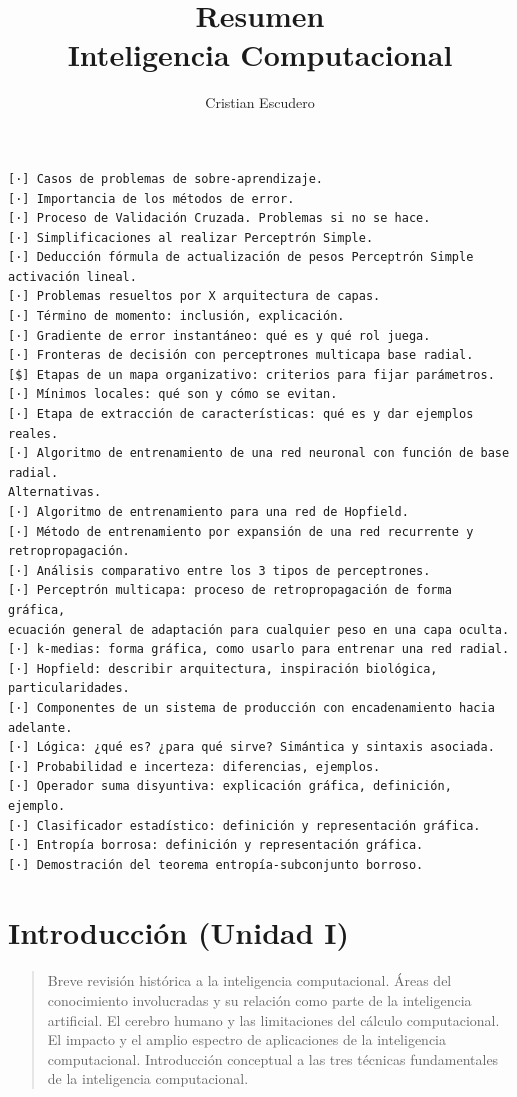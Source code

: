 \documentclass[10pt,a4paper]{article}
\author{Cristian Escudero}
\title{Resumen\\Inteligencia Computacional}
\begin{document}
\maketitle

\begin{verbatim}
[·] Casos de problemas de sobre-aprendizaje.
[·] Importancia de los métodos de error.
[·] Proceso de Validación Cruzada. Problemas si no se hace.
[·] Simplificaciones al realizar Perceptrón Simple.
[·] Deducción fórmula de actualización de pesos Perceptrón Simple activación lineal.
[·] Problemas resueltos por X arquitectura de capas.
[·] Término de momento: inclusión, explicación.
[·] Gradiente de error instantáneo: qué es y qué rol juega.
[·] Fronteras de decisión con perceptrones multicapa base radial.
[$] Etapas de un mapa organizativo: criterios para fijar parámetros.
[·] Mínimos locales: qué son y cómo se evitan.
[·] Etapa de extracción de características: qué es y dar ejemplos reales.
[·] Algoritmo de entrenamiento de una red neuronal con función de base radial. 
Alternativas.
[·] Algoritmo de entrenamiento para una red de Hopfield.
[·] Método de entrenamiento por expansión de una red recurrente y retropropagación.
[·] Análisis comparativo entre los 3 tipos de perceptrones.
[·] Perceptrón multicapa: proceso de retropropagación de forma gráfica,
ecuación general de adaptación para cualquier peso en una capa oculta.
[·] k-medias: forma gráfica, como usarlo para entrenar una red radial.
[·] Hopfield: describir arquitectura, inspiración biológica, particularidades.
[·] Componentes de un sistema de producción con encadenamiento hacia adelante.
[·] Lógica: ¿qué es? ¿para qué sirve? Simántica y sintaxis asociada.
[·] Probabilidad e incerteza: diferencias, ejemplos.
[·] Operador suma disyuntiva: explicación gráfica, definición, ejemplo.
[·] Clasificador estadístico: definición y representación gráfica.
[·] Entropía borrosa: definición y representación gráfica.
[·] Demostración del teorema entropía-subconjunto borroso.
\end{verbatim}

\section*{Introducción (Unidad I)}
\begin{quote}
Breve revisión histórica a la inteligencia computacional. Áreas del conocimiento involucradas y su relación como parte de la inteligencia artificial. El cerebro humano y las limitaciones del cálculo computacional. El impacto y el amplio espectro de aplicaciones de la inteligencia computacional. Introducción conceptual a las tres técnicas fundamentales de la inteligencia computacional.
\end{quote}
\end{document}
